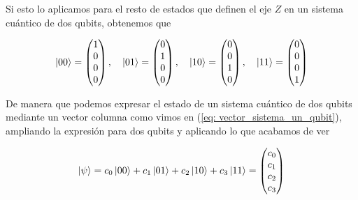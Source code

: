 \documentclass{article}
\numberwithin{equation}{section} %
\begin{document}
    \vspace{2.5mm}

    Si esto lo aplicamos para el resto de estados que definen el eje \( Z \) en un sistema cuántico de dos qubits, obtenemos que

    \begin{equation}
        \ket{0 0} = \begin{pmatrix}
            1 \\
            0 \\
            0 \\
            0 
        \end{pmatrix}, \quad \ket{0 1} = \begin{pmatrix}
            0 \\
            1 \\
            0 \\
            0 
        \end{pmatrix}, \quad \ket{1 0} = \begin{pmatrix}
            0 \\
            0 \\
            1 \\
            0 
        \end{pmatrix}, \quad \ket{1 1} = \begin{pmatrix}
            0 \\
            0 \\
            0 \\
            1 
        \end{pmatrix}
        \label{eq: estados_matricial_2_qubits}
    \end{equation}

    \vspace{2.5mm}

    De manera que podemos expresar el estado de un sistema cuántico de dos qubits mediante un vector columna como vimos en (\ref{eq: vector_sistema_un_qubit}), ampliando la expresión para dos qubits y aplicando lo que acabamos de ver

    \begin{equation}
        \ket{\psi} = c_{0} \ket{0 0} + c_{1} \ket{0 1} + c_{2} \ket{1 0} + c_{3} \ket{1 1} = \begin{pmatrix}
            c_{0} \\
            c_{1} \\
            c_{2} \\
            c_{3}
        \end{pmatrix}
        \label{eq: estado_qubit_dimension_2_matriz}
    \end{equation}
\end{document}
